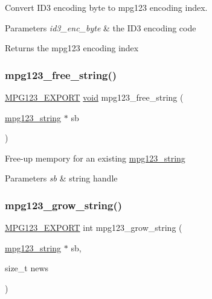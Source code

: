 Convert I\+D3 encoding byte to mpg123 encoding index. 
\begin{DoxyParams}{Parameters}
{\em id3\+\_\+enc\+\_\+byte} & the I\+D3 encoding code \\
\hline
\end{DoxyParams}
\begin{DoxyReturn}{Returns}
the mpg123 encoding index 
\end{DoxyReturn}
\mbox{\label{group__mpg123__metadata_ga254cfe80f5eb2f2715e36be9a5119aed}} 
\subsubsection{\texorpdfstring{mpg123\_free\_string()}{mpg123\_free\_string()}}
{\footnotesize\ttfamily \mbox{\hyperlink{mpg123_8h_a2ba98cfba3f760879df70e755b2a61cc}{M\+P\+G123\+\_\+\+E\+X\+P\+O\+RT}} \mbox{\hyperlink{_s_d_l__opengles2__gl2ext_8h_ae5d8fa23ad07c48bb609509eae494c95}{void}} mpg123\+\_\+free\+\_\+string (\begin{DoxyParamCaption}\item[{\mbox{\hyperlink{structmpg123__string}{mpg123\+\_\+string}} $\ast$}]{sb }\end{DoxyParamCaption})}

Free-\/up mempory for an existing \mbox{\hyperlink{structmpg123__string}{mpg123\+\_\+string}} 
\begin{DoxyParams}{Parameters}
{\em sb} & string handle \\
\hline
\end{DoxyParams}
\mbox{\label{group__mpg123__metadata_ga1125e5a8235c42759d7300797006b05d}} 
\subsubsection{\texorpdfstring{mpg123\_grow\_string()}{mpg123\_grow\_string()}}
{\footnotesize\ttfamily \mbox{\hyperlink{mpg123_8h_a2ba98cfba3f760879df70e755b2a61cc}{M\+P\+G123\+\_\+\+E\+X\+P\+O\+RT}} int mpg123\+\_\+grow\+\_\+string (\begin{DoxyParamCaption}\item[{\mbox{\hyperlink{structmpg123__string}{mpg123\+\_\+string}} $\ast$}]{sb,  }\item[{size\+\_\+t}]{news }\end{DoxyParamCaption})}

